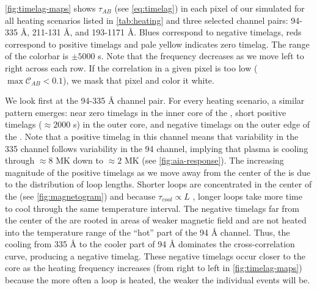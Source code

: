 \autoref{fig:timelag-maps} shows $\tau_{AB}$ (see \autoref{eq:timelag}) in each pixel of our simulated \AR{} for all heating scenarios listed in \autoref{tab:heating} and three selected channel pairs: 94-335 \AA{}, 211-131 \AA{}, and 193-1171 \AA{}. Blues correspond to negative timelags, reds correspond to positive timelags and pale yellow indicates zero timelag. The range of the colorbar is $\pm5000$ s. Note that the frequency decreases as we move left to right across each row. If the correlation in a given pixel is too low ($\max{\mathcal{C}_{AB}}<0.1$), we mask that pixel and color it white. 

We look first at the 94-335 \AA{} channel pair. For every heating scenario, a similar pattern emerges: near zero timelags in the inner core of the \AR{}, short positive timelags ($\approx2000$ s) in the outer core, and negative timelags on the outer edge of the \AR{}. Note that a positive timelag in this channel means that variability in the 335 channel follows variability in the 94 channel, implying that plasma is cooling through $\approx8$ MK down to $\approx2$ MK (see \autoref{fig:aia-response}). The increasing magnitude of the positive timelags as we move away from the center of the \AR{} is due to the distribution of loop lengths. Shorter loops are concentrated in the center of the \AR{} (see \autoref{fig:magnetogram}) and because $\tau_{cool}\propto L$ \citep[see Appendix of][]{cargill_active_2014}, longer loops take more time to cool through the same temperature interval. The negative timelags far from the center of the \AR{} are rooted in areas of weaker magnetic field and are not heated into the temperature range of the ``hot'' part of the 94 \AA{} channel. Thus, the cooling from 335 \AA{} to the cooler part of 94 \AA{} dominates the cross-correlation curve, producing a negative timelag. These negative timelags occur closer to the core as the heating frequency increases (from right to left in \autoref{fig:timelag-maps}) because the more often a loop is heated, the weaker the individual events will be. 


